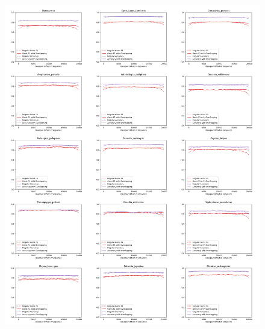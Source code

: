 \documentclass{article}
\begin{document}
\begin{figure}[!h]
\centerline{\includegraphics[width=\overlapscale\textwidth]{images/overlapping/montage_animals3}}
\end{figure}
\end{document}
